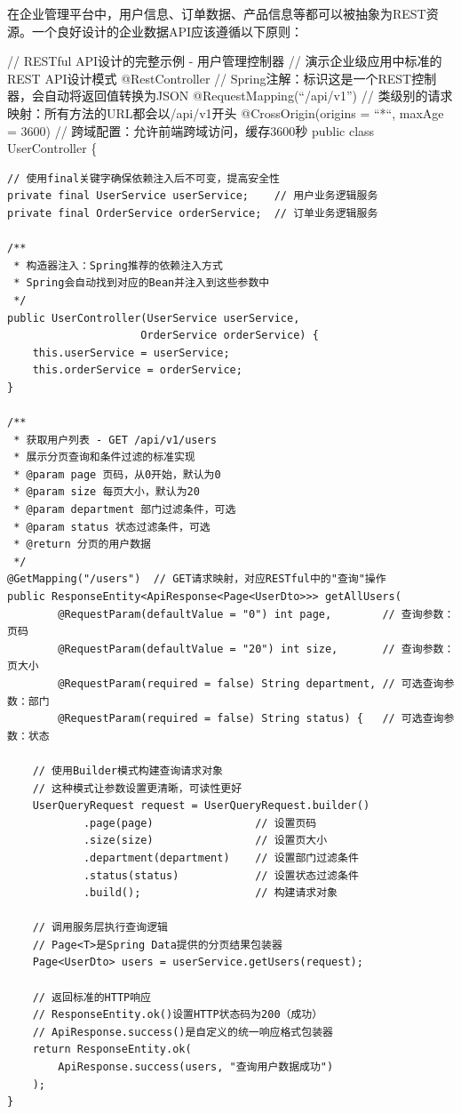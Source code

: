 在企业管理平台中，用户信息、订单数据、产品信息等都可以被抽象为REST资源。一个良好设计的企业数据API应该遵循以下原则：

// RESTful API设计的完整示例 - 用户管理控制器 // 演示企业级应用中标准的REST API设计模式 @RestController // Spring注解：标识这是一个REST控制器，会自动将返回值转换为JSON @RequestMapping(``/api/v1'') // 类级别的请求映射：所有方法的URL都会以/api/v1开头 @CrossOrigin(origins = ``*``, maxAge = 3600) // 跨域配置：允许前端跨域访问，缓存3600秒 public class UserController \{

\begin{verbatim}
// 使用final关键字确保依赖注入后不可变，提高安全性
private final UserService userService;    // 用户业务逻辑服务
private final OrderService orderService;  // 订单业务逻辑服务

/**
 * 构造器注入：Spring推荐的依赖注入方式
 * Spring会自动找到对应的Bean并注入到这些参数中
 */
public UserController(UserService userService, 
                     OrderService orderService) {
    this.userService = userService;
    this.orderService = orderService;
}

/**
 * 获取用户列表 - GET /api/v1/users
 * 展示分页查询和条件过滤的标准实现
 * @param page 页码，从0开始，默认为0
 * @param size 每页大小，默认为20
 * @param department 部门过滤条件，可选
 * @param status 状态过滤条件，可选
 * @return 分页的用户数据
 */
@GetMapping("/users")  // GET请求映射，对应RESTful中的"查询"操作
public ResponseEntity<ApiResponse<Page<UserDto>>> getAllUsers(
        @RequestParam(defaultValue = "0") int page,        // 查询参数：页码
        @RequestParam(defaultValue = "20") int size,       // 查询参数：页大小
        @RequestParam(required = false) String department, // 可选查询参数：部门
        @RequestParam(required = false) String status) {   // 可选查询参数：状态
    
    // 使用Builder模式构建查询请求对象
    // 这种模式让参数设置更清晰，可读性更好
    UserQueryRequest request = UserQueryRequest.builder()
            .page(page)                // 设置页码
            .size(size)                // 设置页大小
            .department(department)    // 设置部门过滤条件
            .status(status)            // 设置状态过滤条件
            .build();                  // 构建请求对象
            
    // 调用服务层执行查询逻辑
    // Page<T>是Spring Data提供的分页结果包装器
    Page<UserDto> users = userService.getUsers(request);
    
    // 返回标准的HTTP响应
    // ResponseEntity.ok()设置HTTP状态码为200（成功）
    // ApiResponse.success()是自定义的统一响应格式包装器
    return ResponseEntity.ok(
        ApiResponse.success(users, "查询用户数据成功")
    );
}


\end{verbatim}
